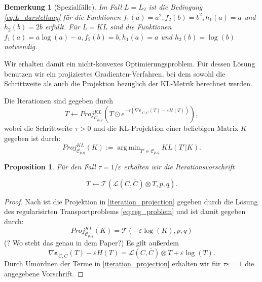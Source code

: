 \documentclass[11pt,a4paper]{article}
\DeclareMathOperator*{\argmin}{arg\,min}
\newtheorem{proposition}[theorem]{Proposition}
\newtheorem{remark}[theorem]{Bemerkung}
\numberwithin{equation}{section}
\begin{document}
	\begin{remark}[Spezialfälle]
		Im Fall $L=L_2$ ist die Bedingung \autoref{eq:L_darstellung} für die Funktionen $f_1(a) = a^2, f_2(b) = b^2, h_1(a) = a$ und $h_2(b) = 2b$ erfüllt.
		Für $L=KL$ sind die Funktionen $f_1(a) = a \log (a) -a, f_2(b) = b, h_1(a) =a $ und $h_2(b) = \log (b)$ notwendig.
	\end{remark}
	
	
	
	
	
	Wir erhalten damit ein nicht-konvexes Optimierungsproblem. Für dessen Lösung benutzen wir ein projiziertes Gradienten-Verfahren, bei dem sowohl die Schrittweite als auch die Projektion bezüglich der KL-Metrik berechnet werden.
	
	Die Iterationen sind gegeben durch
	\begin{equation}
	T \leftarrow Proj_{\mathcal{C}_{p,q}}^{KL} \left(T \odot e^{-\tau( \nabla \boldsymbol{\varepsilon}_{C, \bar{C}}(T) -\varepsilon H(T))} \right), \label{iteration_projection}
	\end{equation}
	wobei die Schrittweite $\tau > 0$ und die KL-Projektion einer beliebigen Matrix $K$ gegeben ist durch:
	\begin{equation}
	Proj_{\mathcal{C}_{p,q}}^{KL}(K) := \argmin_{T' \in \mathcal{C}_{p,q}} KL(T'|K).
	\end{equation}
	
	\begin{proposition} \label{prop:iteration_GW_eps}
		Für den Fall $\tau= 1/\varepsilon$ erhalten wir die Iterationsvorschrift
		
		\begin{equation}
		T \leftarrow \mathcal{T}(\mathcal{L} (C, \bar{C}) \otimes T,p,q). \label{simple_iteration}
		\end{equation}
	\end{proposition}
	\begin{proof}
		Nach \cite{iterative_bregman_projections} ist die Projektion in \ref{iteration_projection} gegeben durch die Lösung des regularisirten Transportproblems \ref{eq:reg_problem} und ist damit gegeben durch:
		\begin{equation}
		Proj_{\mathcal{C}_{p,q}}^{KL}(K) = \mathcal{T}(-\varepsilon \log (K), p, q)
		\end{equation}
		(? Wo steht das genau in dem Paper?)
		Es gilt außerdem
		\begin{equation}
		\nabla \boldsymbol{\varepsilon}_{C, \bar{C}}(T) -\varepsilon H(T) = \mathcal{L}(C,\bar{C}) \otimes T + \varepsilon\log (T).
		\end{equation}
		Durch Umordnen der Terme in \autoref{iteration_projection} erhalten wir für $\tau \varepsilon = 1$ die angegebene Vorschrift.
	\end{proof}
	
\end{document}
